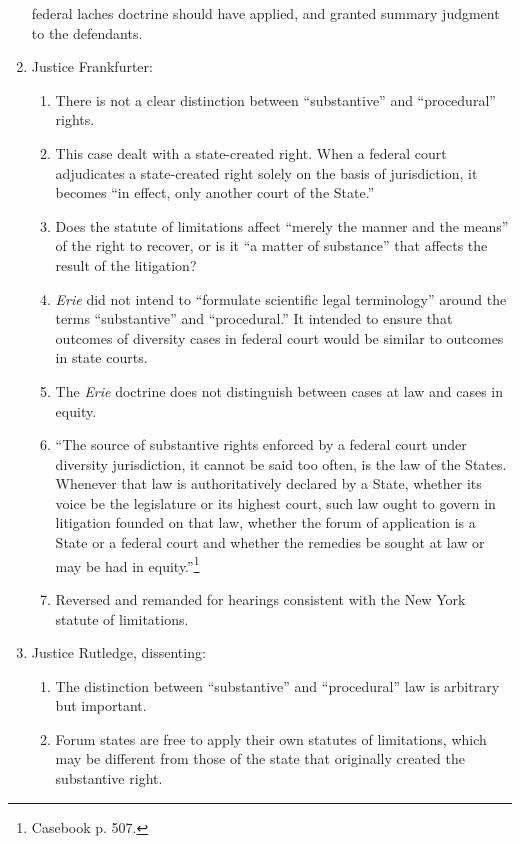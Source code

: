 \begin{enumerate}
    federal laches doctrine should have applied, and granted summary judgment 
    to the defendants.
    \item Justice Frankfurter:
    \begin{enumerate}
        \item There is not a clear distinction between ``substantive'' and 
        ``procedural'' rights.
        \item This case dealt with a state-created right. When a federal court 
        adjudicates a state-created right solely on the basis of jurisdiction, 
        it becomes ``in effect, only another court of the State.''
        \item Does the statute of limitations affect ``merely the manner and 
        the means'' of the right to recover, or is it ``a matter of 
        substance'' that affects the result of the litigation?
        \item \emph{Erie} did not intend to ``formulate scientific legal 
        terminology'' around the terms ``substantive'' and ``procedural.'' It 
        intended to ensure that outcomes of diversity cases in federal court 
        would be similar to outcomes in state courts.
        \item The \emph{Erie} doctrine does not distinguish between cases at 
        law and cases in equity.
        \item ``The source of substantive rights enforced by a federal court 
        under diversity jurisdiction, it cannot be said too often, is the law 
        of the States. Whenever that law is authoritatively declared by a 
        State, whether its voice be the legislature or its highest court, such 
        law ought to govern in litigation founded on that law, whether the 
        forum of application is a State or a federal court and whether the 
        remedies be sought at law or may be had in equity.''\footnote{Casebook 
        p. 507.}
        \item Reversed and remanded for hearings consistent with the New York 
        statute of limitations.
    \end{enumerate}
    \item Justice Rutledge, dissenting:
    \begin{enumerate}
        \item The distinction between ``substantive'' and ``procedural'' law 
        is arbitrary but important.
        \item Forum states are free to apply their own statutes of 
        limitations, which may be different from those of the state that 
        originally created the substantive right.
    \end{enumerate}
\end{enumerate}

